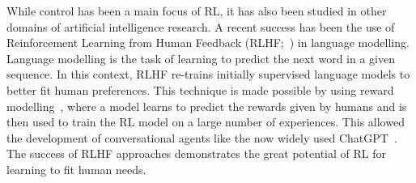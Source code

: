 While control has been a main focus of RL, it has also been studied in other domains of artificial intelligence research. 
A recent success has been the use of Reinforcement Learning from Human Feedback (RLHF;~\cite{Christiano2017_RLHF,Stiennon2020}) in language modelling. Language modelling is the task of learning to predict the next word in a given sequence. In this context, RLHF re-trains initially supervised language models to better fit human preferences. This technique is made possible by using reward modelling~\citep{Leike2018_RewardModel}, where a model learns to predict the rewards given by humans and is then used to train the RL model on a large number of experiences. This allowed the development of conversational agents like the now widely used ChatGPT~\citep{Ouyang2022_InstructGPT}. The success of RLHF approaches demonstrates the great potential of RL for learning to fit human needs. 

